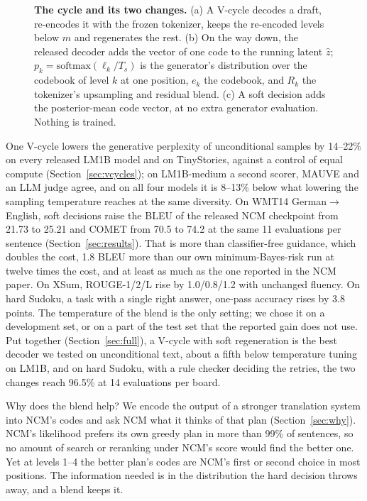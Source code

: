 \documentclass[11pt]{article}
\begin{document}
\begin{figure}[t]
\centering
\resizebox{\linewidth}{!}{}
\caption{\textbf{The cycle and its two changes.} (a) A V-cycle decodes a draft, re-encodes it with the frozen tokenizer, keeps
the re-encoded levels below $m$ and regenerates the rest. (b) On the way down, the released decoder adds the vector of
one code to the running latent $\hat z$; $p_k=\mathrm{softmax}(\ell_k/T_s)$ is the generator's distribution over the
codebook of level $k$ at one position, $e_k$ the codebook, and $R_k$ the tokenizer's upsampling and residual blend.
(c) A soft decision adds the posterior-mean code vector, at no extra generator evaluation. Nothing is trained.}
\label{fig:method}
\end{figure}

One V-cycle lowers the generative perplexity of unconditional samples by 14--22\% on every
released LM1B model and on TinyStories, against a control of equal compute (Section~\ref{sec:vcycles}); on LM1B-medium
a second scorer, MAUVE and an LLM judge agree, and on all four models it is 8--13\% below what lowering the sampling
temperature reaches at the same diversity. On WMT14 German$\to$English, soft decisions raise the BLEU of the
released NCM checkpoint from 21.73 to 25.21 and COMET from 70.5 to 74.2 at the same 11 evaluations per sentence
(Section~\ref{sec:results}). That is more than classifier-free guidance, which doubles the cost, 1.8 BLEU more than
our own minimum-Bayes-risk run at twelve times the cost, and at least as much as the one reported in the NCM paper.
On XSum, ROUGE-1/2/L rise by
1.0/0.8/1.2 with unchanged fluency. On hard Sudoku, a task with a single right answer, one-pass accuracy rises by 3.8
points. The temperature of the blend is the only setting; we chose it on a development set, or on a part of the test
set that the reported gain does not use. Put together (Section~\ref{sec:full}), a V-cycle with soft regeneration is
the best decoder we tested on unconditional text, about a fifth below temperature tuning on LM1B, and on hard Sudoku,
with a rule checker deciding the retries, the two changes reach 96.5\% at 14 evaluations per board.

Why does the blend help? We encode the output of a stronger translation system into NCM's codes and ask NCM what it
thinks of that plan (Section~\ref{sec:why}). NCM's likelihood prefers its own greedy plan in more than 99\% of
sentences, so no amount of search or reranking under NCM's score would find the better one. Yet at levels 1--4 the
better plan's codes are NCM's first or second choice in most positions. The information needed is in the distribution
the hard decision throws away, and a blend keeps it.
\end{document}

